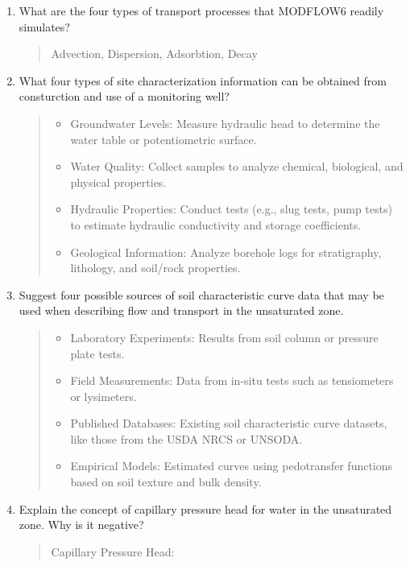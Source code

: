 \documentclass[12pt]{article}
\begin{document}
\begin{enumerate}
\item What are the four types of transport processes that MODFLOW6 readily simulates? 
\begin{quote}
Advection, Dispersion, Adsorbtion, Decay
\end{quote}
\clearpage

\item What four types of site characterization information can be obtained from consturction and use of a monitoring well?
\begin{quote}
\begin{itemize}
\item Groundwater Levels: Measure hydraulic head to determine the water table or potentiometric surface.
\item Water Quality: Collect samples to analyze chemical, biological, and physical properties.
\item Hydraulic Properties: Conduct tests (e.g., slug tests, pump tests) to estimate hydraulic conductivity and storage coefficients.
\item Geological Information: Analyze borehole logs for stratigraphy, lithology, and soil/rock properties.
\end{itemize}
\end{quote}
\clearpage

\item Suggest four possible sources of soil characteristic curve data that may be used when describing flow and transport in the unsaturated zone.

\begin{quote}
\begin{itemize}
\item Laboratory Experiments: Results from soil column or pressure plate tests.
\item Field Measurements: Data from in-situ tests such as tensiometers or lysimeters.
\item Published Databases: Existing soil characteristic curve datasets, like those from the USDA NRCS or UNSODA.
\item Empirical Models: Estimated curves using pedotransfer functions based on soil texture and bulk density.
\end{itemize}
\end{quote}
\clearpage

\item Explain the concept of capillary pressure head for water in the unsaturated zone. Why is it negative?
\begin{quote}
Capillary Pressure Head:


\end{quote}
\end{enumerate}
\end{document}
